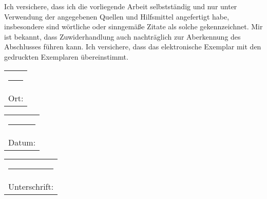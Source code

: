 \documentclass[
  fontsize=12pt,
  a4paper,  %
  twoside,  %
  bibliography=totoc,
  headsepline,
  cleardoublepage=empty,
  parskip=half,
  draft=false
]{scrbook}
\begin{document}
Ich versichere, dass ich die vorliegende Arbeit selbstständig und nur unter Verwendung der angegebenen Quellen und Hilfsmittel angefertigt habe, insbesondere sind wörtliche oder sinngemäße Zitate als solche gekennzeichnet. Mir ist bekannt, dass Zuwiderhandlung auch nachträglich zur Aberkennung des Abschlusses führen kann.
Ich versichere, dass das elektronische Exemplar mit den gedruckten Exemplaren übereinstimmt.

\vspace{2cm}

\hfill
\begin{tabular}[t]{c}
	\rule{10em}{0.4pt}\\ Ort:
\end{tabular}
\hfill
\begin{tabular}[t]{c}
	\rule{10em}{0.4pt}\\ Datum:
\end{tabular}
\hfill
\begin{tabular}[t]{c}
	\rule{10em}{0.4pt}\\ Unterschrift:
\end{tabular}
\hfill
\hfill\strut

\pagestyle{empty}
\renewcommand*{\chapterpagestyle}{empty}
\end{document}
